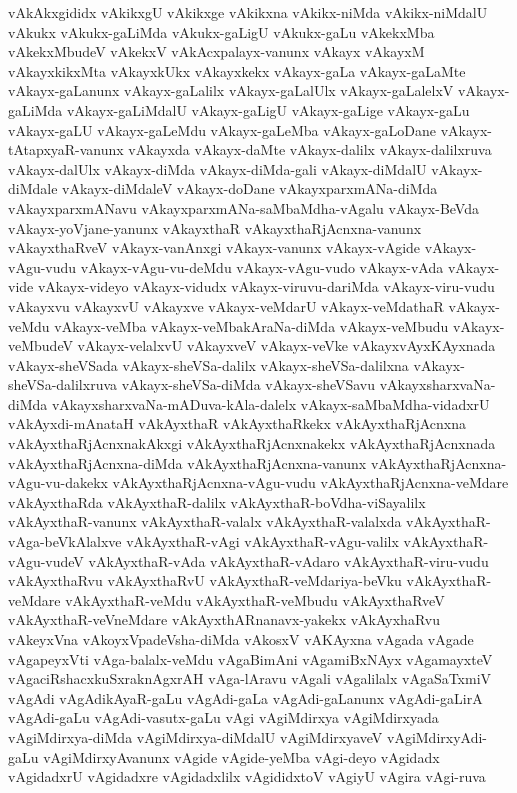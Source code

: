 {vAkAkxgididx
vAkikxgU
vAkikxge
vAkikxna
vAkikx-niMda
vAkikx-niMdalU
vAkukx
vAkukx-gaLiMda
vAkukx-gaLigU
vAkukx-gaLu
vAkekxMba
vAkekxMbudeV
vAkekxV
vAkAcxpalayx-vanunx
vAkayx
vAkayxM
vAkayxkikxMta
vAkayxkUkx
vAkayxkekx
vAkayx-gaLa
vAkayx-gaLaMte
vAkayx-gaLanunx
vAkayx-gaLalilx
vAkayx-gaLalUlx
vAkayx-gaLalelxV
vAkayx-gaLiMda
vAkayx-gaLiMdalU
vAkayx-gaLigU
vAkayx-gaLige
vAkayx-gaLu
vAkayx-gaLU
vAkayx-gaLeMdu
vAkayx-gaLeMba
vAkayx-gaLoDane
vAkayx-tAtapxyaR-vanunx
vAkayxda
vAkayx-daMte
vAkayx-dalilx
vAkayx-dalilxruva
vAkayx-dalUlx
vAkayx-diMda
vAkayx-diMda-gali
vAkayx-diMdalU
vAkayx-diMdale
vAkayx-diMdaleV
vAkayx-doDane
vAkayxparxmANa-diMda
vAkayxparxmANavu
vAkayxparxmANa-saMbaMdha-vAgalu
vAkayx-BeVda
vAkayx-yoVjane-yanunx
vAkayxthaR
vAkayxthaRjAcnxna-vanunx
vAkayxthaRveV
vAkayx-vanAnxgi
vAkayx-vanunx
vAkayx-vAgide
vAkayx-vAgu-vudu
vAkayx-vAgu-vu-deMdu
vAkayx-vAgu-vudo
vAkayx-vAda
vAkayx-vide
vAkayx-videyo
vAkayx-vidudx
vAkayx-viruvu-dariMda
vAkayx-viru-vudu
vAkayxvu
vAkayxvU
vAkayxve
vAkayx-veMdarU
vAkayx-veMdathaR
vAkayx-veMdu
vAkayx-veMba
vAkayx-veMbakAraNa-diMda
vAkayx-veMbudu
vAkayx-veMbudeV
vAkayx-velalxvU
vAkayxveV
vAkayx-veVke
vAkayxvAyxKAyxnada
vAkayx-sheVSada
vAkayx-sheVSa-dalilx
vAkayx-sheVSa-dalilxna
vAkayx-sheVSa-dalilxruva
vAkayx-sheVSa-diMda
vAkayx-sheVSavu
vAkayxsharxvaNa-diMda
vAkayxsharxvaNa-mADuva-kAla-dalelx
vAkayx-saMbaMdha-vidadxrU
vAkAyxdi-mAnataH
vAkAyxthaR
vAkAyxthaRkekx
vAkAyxthaRjAcnxna
vAkAyxthaRjAcnxnakAkxgi
vAkAyxthaRjAcnxnakekx
vAkAyxthaRjAcnxnada
vAkAyxthaRjAcnxna-diMda
vAkAyxthaRjAcnxna-vanunx
vAkAyxthaRjAcnxna-vAgu-vu-dakekx
vAkAyxthaRjAcnxna-vAgu-vudu
vAkAyxthaRjAcnxna-veMdare
vAkAyxthaRda
vAkAyxthaR-dalilx
vAkAyxthaR-boVdha-viSayalilx
vAkAyxthaR-vanunx
vAkAyxthaR-valalx
vAkAyxthaR-valalxda
vAkAyxthaR-vAga-beVkAlalxve
vAkAyxthaR-vAgi
vAkAyxthaR-vAgu-valilx
vAkAyxthaR-vAgu-vudeV
vAkAyxthaR-vAda
vAkAyxthaR-vAdaro
vAkAyxthaR-viru-vudu
vAkAyxthaRvu
vAkAyxthaRvU
vAkAyxthaR-veMdariya-beVku
vAkAyxthaR-veMdare
vAkAyxthaR-veMdu
vAkAyxthaR-veMbudu
vAkAyxthaRveV
vAkAyxthaR-veVneMdare
vAkAyxthARnanavx-yakekx
vAkAyxhaRvu
vAkeyxVna
vAkoyxVpadeVsha-diMda
vAkosxV
vAKAyxna
vAgada
vAgade
vAgapeyxVti
vAga-balalx-veMdu
vAgaBimAni
vAgamiBxNAyx
vAgamayxteV
vAgaciRshacxkuSxraknAgxrAH
vAga-lAravu
vAgali
vAgalilalx
vAgaSaTxmiV
vAgAdi
vAgAdikAyaR-gaLu
vAgAdi-gaLa
vAgAdi-gaLanunx
vAgAdi-gaLirA
vAgAdi-gaLu
vAgAdi-vasutx-gaLu
vAgi
vAgiMdirxya
vAgiMdirxyada
vAgiMdirxya-diMda
vAgiMdirxya-diMdalU
vAgiMdirxyaveV
vAgiMdirxyAdi-gaLu
vAgiMdirxyAvanunx
vAgide
vAgide-yeMba
vAgi-deyo
vAgidadx
vAgidadxrU
vAgidadxre
vAgidadxlilx
vAgididxtoV
vAgiyU
vAgira
vAgi-ruva
}
